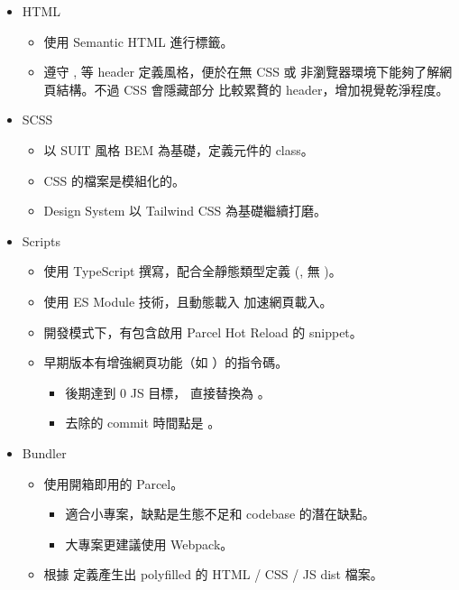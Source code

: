 \documentclass[12pt]{article}
\begin{document}
  \begin{itemize}
    \item HTML
      \begin{itemize}
        \item 使用 Semantic HTML 進行標籤。
        \item 遵守 ,  等 header 定義風格，便於在無 CSS 或
        非瀏覽器環境下能夠了解網頁結構。不過 CSS 會隱藏部分
        比較累贅的 header，增加視覺乾淨程度。
      \end{itemize}
    \item SCSS
      \begin{itemize}
        \item 以 SUIT 風格 BEM 為基礎，定義元件的 class。
        \item CSS 的檔案是模組化的。
        \item Design System 以 Tailwind CSS 為基礎繼續打磨。
      \end{itemize}
    \item Scripts
      \begin{itemize}
        \item 使用 TypeScript 撰寫，配合全靜態類型定義 (, 無 )。
        \item 使用 ES Module 技術，且動態載入  加速網頁載入。
        \item 開發模式下，有包含啟用 Parcel Hot Reload 的 snippet。
        \item 早期版本有增強網頁功能（如 ）的指令碼。
          \begin{itemize}
            \item 後期達到 0 JS 目標， 直接替換為 。
            \item 去除的 commit 時間點是 。
          \end{itemize}
      \end{itemize}
    \item Bundler
      \begin{itemize}
        \item 使用開箱即用的 Parcel。
          \begin{itemize}
            \item 適合小專案，缺點是生態不足和 codebase 的潛在缺點。
            \item 大專案更建議使用 Webpack。
          \end{itemize}
        \item 根據  定義產生出 polyfilled 的 HTML / CSS / JS dist 檔案。

\end{itemize}
\end{itemize}
\end{document}
